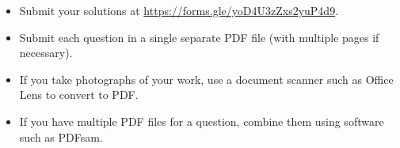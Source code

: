 \documentclass{article}
\begin{document}
\vfill
\begin{itemize}
	\item Submit your solutions at \url{https://forms.gle/yoD4U3zZxs2yuP4d9}.
	\item Submit each question in a single separate PDF file (with multiple pages if necessary).
	\item If you take photographs of your work, use a document scanner such as Office Lens to convert to PDF.
	\item If you have multiple PDF files for a question, combine them using software such as PDFsam.
\end{itemize}
\end{document}
